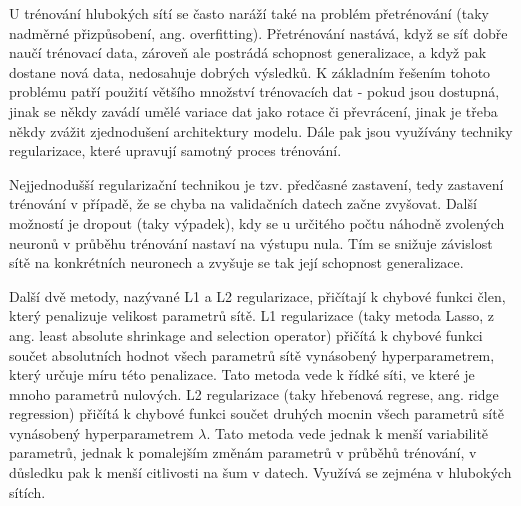 U trénování hlubokých sítí se často naráží také na problém přetrénování (taky
nadměrné přizpůsobení, ang. overfitting). Přetrénování nastává, když se síť
dobře naučí trénovací data, zároveň ale postrádá schopnost generalizace, a když
pak dostane nová data, nedosahuje dobrých výsledků. K základním řešením tohoto
problému patří použití většího množství trénovacích dat - pokud jsou dostupná,
jinak se někdy zavádí umělé variace dat jako rotace či převrácení, jinak je
třeba někdy zvážit zjednodušení architektury modelu. Dále pak jsou využívány
techniky regularizace, které upravují samotný proces trénování.

Nejjednodušší regularizační technikou je tzv. předčasné zastavení, tedy
zastavení trénování v případě, že se chyba na validačních datech začne
zvyšovat. Další možností je dropout (taky výpadek), kdy se u určitého počtu
náhodně zvolených neuronů v průběhu trénování nastaví na výstupu nula. Tím se
snižuje závislost sítě na konkrétních neuronech a zvyšuje se tak její schopnost
generalizace.

Další dvě metody, nazývané L1 a L2 regularizace, přičítají k chybové funkci
člen, který penalizuje velikost parametrů sítě. L1 regularizace (taky metoda
Lasso, z ang. least absolute shrinkage and selection operator) přičítá k
chybové funkci součet absolutních hodnot všech parametrů sítě vynásobený
hyperparametrem, který určuje míru této penalizace. Tato metoda vede k řídké
síti, ve které je mnoho parametrů nulových. L2 regularizace (taky hřebenová
regrese, ang. ridge regression) přičítá k chybové funkci součet druhých mocnin
všech parametrů sítě vynásobený hyperparametrem $\lambda$. Tato metoda vede
jednak k menší variabilitě parametrů, jednak k pomalejším změnám parametrů v
průběhů trénování, v důsledku pak k menší citlivosti na šum v datech. Využívá
se zejména v hlubokých sítích.

\endinput